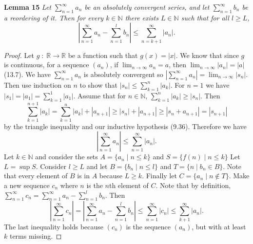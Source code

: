 \documentclass{article}
\begin{document}
\begin{flushleft}
\textbf{Lemma 15}
\textsl{Let $\sum_{n=1}^{\infty} a_n$ be an absolutely convergent series, and let $\sum_{n=1}^{\infty} b_n$ be a reordering of it. Then for every $k \in \mathbb{N}$ there exists $L \in \mathbb{N}$ such that for all $l \geq L$,
\[
\left | \sum_{n=1}^{\infty} a_n - \sum_{n=1}^{l} b_n \right | \leq \sum_{n=k+1}^{\infty} |a_n|.
\]}
\begin{proof}
Let $g \; : \; \mathbb{R} \rightarrow \mathbb{R}$ be a function such that $g(x) = |x|$. We know that since $g$ is continuous, for a sequence $(a_n)$, if $\lim_{n \rightarrow \infty} a_n = a$, then $\lim_{n \rightarrow \infty} |a_n| = |a|$ (13.7). We have $\sum_{n=1}^{\infty} a_n$ is absolutely convergent so $|\sum_{n=1}^{\infty} a_n| = \lim_{n \rightarrow \infty} |s_n|$. Then use induction on $n$ to show that $|s_n| \leq \sum_{k=1}^{n} |a_k|$. For $n=1$ we have $|s_1| = |a_1| = \sum_{k=1}^{1} |a_1|$. Assume that for $n \in \mathbb{N}$, $\sum_{k=1}^{n} |a_k| \geq |s_n|$. Then
\[
\sum_{k=1}^{n+1} |a_k| = \sum_{k=1}^{n} |a_k| + |a_{n+1}| \geq |s_n| + |a_{n+1}| \geq |s_n + a_{n+1}| = |s_{n+1}|
\]
by the triangle inequality and our inductive hypothesis (9.36). Therefore we have
\[
\left | \sum_{n=1}^{\infty} a_n \right | \leq \sum_{n=1}^{\infty} |a_n|.
\]
Let $k \in \mathbb{N}$ and consider the sets $A = \{a_n \mid n \leq k\}$ and $S = \{f(n) \mid n \leq k\}$ Let $L = \sup S$. Consider $l \geq L$ and let $B = \{b_n \mid n \leq l\}$ and $T = \{n \mid b_n \in B\}$. Note that every element of $B$ is in $A$ because $L \geq k$. Finally let $C = \{a_n \mid n \notin T\}$. Make a new sequence $c_n$ where $n$ is the $n$th element of $C$. Note that by definition, $\sum_{n=1}^{\infty} c_n = \sum_{n=1}^{\infty} a_n - \sum_{n=1}^{l} b_n$. Then
\[
\left | \sum_{n=1}^{\infty} c_n \right | = \left | \sum_{n=1}^{\infty} a_n - \sum_{n=1}^{l} b_n \right | \leq \sum_{n=1}^{\infty} |c_n| \leq \sum_{k+1}^{\infty} |a_n|.
\]
The last inequality holds because $(c_n)$ is the sequence $(a_n)$, but with at least $k$ terms missing.
\end{proof}


\end{flushleft}
\end{document}
